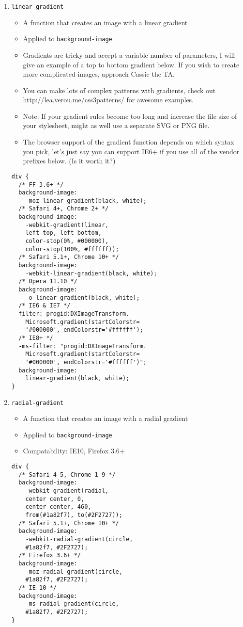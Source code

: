 \documentclass[10pt, twocolumn]{article}
\begin{document}
\begin{enumerate}
\item \texttt{linear-gradient}
\begin{itemize}
\item A function that creates an image with a linear gradient
\item Applied to \texttt{background-image}
\item Gradients are tricky and accept a variable number of parameters, I will give an example of a top to bottom gradient below. If you wish to create more complicated images, approach Cassie the TA.
\item You can make lots of complex patterns with gradients, check out http://lea.verou.me/css3patterns/ for awesome examples.
\item Note: If your gradient rules become too long and increase the file size of your stylesheet, might as well use a separate SVG or PNG file.
\item The browser support of the gradient function depends on which syntax you pick, let's just say you can support IE6+ if you use all of the vendor prefixes below. (Is it worth it?)
\end{itemize}
\begin{lstlisting}[frame=single]
div {
  /* FF 3.6+ */  
  background-image: 
    -moz-linear-gradient(black, white); 
  /* Safari 4+, Chrome 2+ */  
  background-image: 
    -webkit-gradient(linear, 
    left top, left bottom, 
    color-stop(0%, #000000), 
    color-stop(100%, #ffffff));
  /* Safari 5.1+, Chrome 10+ */   
  background-image: 
    -webkit-linear-gradient(black, white); 
  /* Opera 11.10 */  
  background-image: 
    -o-linear-gradient(black, white);
  /* IE6 & IE7 */  
  filter: progid:DXImageTransform.
    Microsoft.gradient(startColorstr=
    '#000000', endColorstr='#ffffff');  
  /* IE8+ */ 
  -ms-filter: "progid:DXImageTransform.
    Microsoft.gradient(startColorstr=
    '#000000', endColorstr='#ffffff')";  
  background-image: 
    linear-gradient(black, white);
}
\end{lstlisting}

\item \texttt{radial-gradient}
\begin{itemize}
\item A function that creates an image with a radial gradient
\item Applied to \texttt{background-image}
\item Compatability: IE10, Firefox 3.6+
\end{itemize}
\begin{lstlisting}[frame=single]
div {
  /* Safari 4-5, Chrome 1-9 */
  background-image: 
    -webkit-gradient(radial, 
    center center, 0,
    center center, 460, 
    from(#1a82f7), to(#2F2727)); 
  /* Safari 5.1+, Chrome 10+ */
  background-image: 
    -webkit-radial-gradient(circle, 
    #1a82f7, #2F2727);
  /* Firefox 3.6+ */ 
  background-image: 
    -moz-radial-gradient(circle, 
    #1a82f7, #2F2727);
  /* IE 10 */ 
  background-image: 
    -ms-radial-gradient(circle, 
    #1a82f7, #2F2727);
}
\end{lstlisting}


\end{enumerate}
\end{document}
